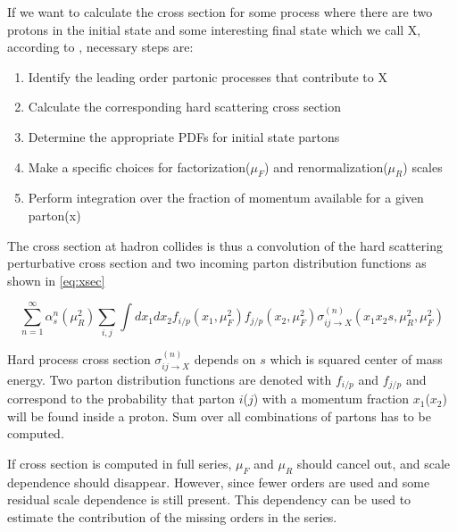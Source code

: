 If we want to calculate the cross section for some process where there are two protons in the initial state and some interesting final state which we call X, according to \citep{Campbell:2006wx}, necessary steps are:
\begin{enumerate}
	\item Identify the leading order partonic processes that contribute to X
	\item Calculate the corresponding hard scattering cross section
	\item Determine the appropriate PDFs for initial state partons
	\item Make a specific choices for factorization($\mu_F$) and renormalization($\mu_R$) scales
	\item Perform integration over the fraction of momentum available for a given parton(x)  
\end{enumerate}

The cross section at hadron collides is thus a convolution of the hard scattering perturbative cross section and two incoming parton distribution functions as shown in \ref{eq:xsec}

\begin{equation}
 \sum\limits_{n=1}^{\infty} \alpha_{s}^{n}(\mu_{R}^2)\sum\limits_{i,j} \int dx_1 dx_2 f_{i/p}(x_1,\mu_{F}^2) f_{j/p}(x_2,\mu_{F}^2) \sigma_{ij \rightarrow X}^{(n)}(x_1 x_2s,\mu_{R}^2,\mu_{F}^2)
 \label{eq:xsec}
\end{equation} 

Hard process cross section $\sigma_{ij \rightarrow X}^{(n)}$ depends on $s$ which is squared center of mass energy. Two parton distribution functions are denoted with $f_{i/p}$ and $f_{j/p}$ and correspond to the probability that parton $i$($j$) with a momentum fraction $x_1$($x_2$) will be found inside a proton. Sum over all combinations of partons has to be computed. 

If cross section is computed in full series, $\mu_F$ and $\mu_R$ should cancel out, and scale dependence should disappear. However, since fewer orders are used and some residual scale dependence is still present. This dependency can be used to estimate the contribution of the missing orders in the series.  


